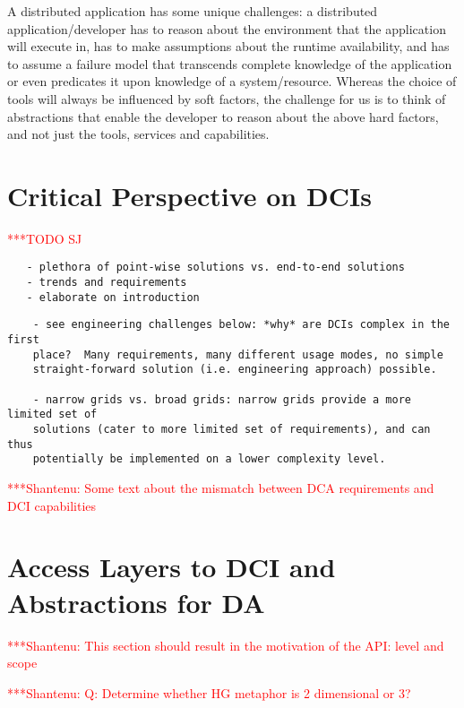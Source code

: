 \documentclass[a4paper,10pt]{article}
\newcommand{\todo}[1]{     {\textcolor{red}  { ***TODO      #1 }}}
\newcommand{\jhanote}[1]{  {\textcolor{red}  { ***Shantenu: #1 }}}
\newcommand{\todo}[1]{}
\newcommand{\jhanote}[1]{}
\begin{document}
A distributed application has some unique challenges: a distributed
application/developer has to reason about the environment that the
application will execute in, has to make assumptions about the runtime
availability, and has to assume a failure model that transcends
complete knowledge of the application or even predicates it upon
knowledge of a system/resource.  Whereas the choice of tools will
always be influenced by soft factors, the challenge for us is to think
of abstractions that enable the developer to reason about the above
hard factors, and not just the tools, services and capabilities.



\section{Critical Perspective on DCIs}
\todo{SJ}

 \begin{verbatim}
   - plethora of point-wise solutions vs. end-to-end solutions
   - trends and requirements
   - elaborate on introduction
 \end{verbatim}

  \begin{verbatim}
    - see engineering challenges below: *why* are DCIs complex in the first
    place?  Many requirements, many different usage modes, no simple
    straight-forward solution (i.e. engineering approach) possible.

    - narrow grids vs. broad grids: narrow grids provide a more limited set of
    solutions (cater to more limited set of requirements), and can thus
    potentially be implemented on a lower complexity level.
  \end{verbatim}

  \jhanote{Some text about the mismatch between DCA requirements and
  DCI capabilities}

\section{Access Layers to DCI and Abstractions for DA}

 \jhanote{This section should result in the motivation of the API: level and scope}

 \jhanote{Q: Determine whether HG metaphor is 2 dimensional or 3?}
\end{document}
